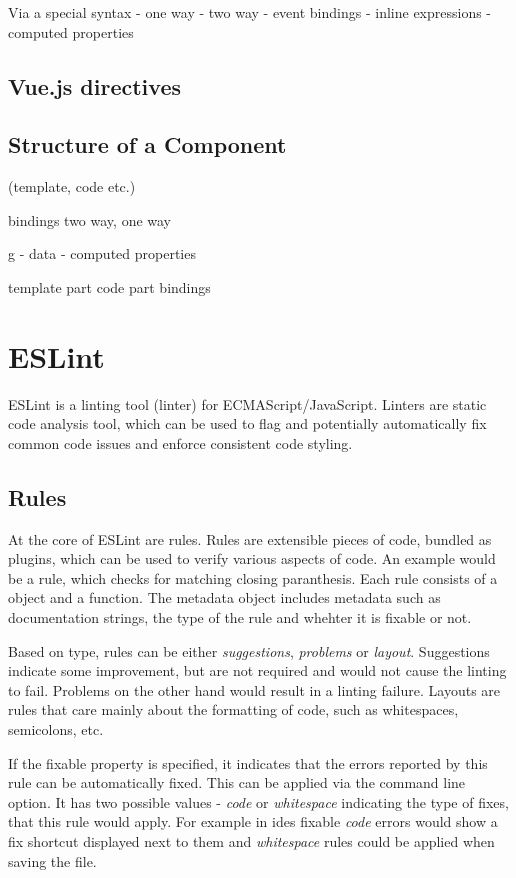 Via a special syntax
- one way
- two way
- event bindings
- inline expressions
- computed properties

\subsection{Vue.js directives}
\subsection{Structure of a Component}

(template, code etc.)

bindings two way, one way

g
- data
- computed properties

template part
code part
bindings


\section{ESLint}

ESLint \parencite{eslintMainPage} is a linting tool (linter) for ECMAScript/JavaScript. Linters are static code analysis tool, which can be used to flag and potentially automatically fix common code issues and enforce consistent code styling.

\subsection{Rules}
At the core of ESLint are rules. Rules are extensible pieces of code, bundled as plugins, which can be used to verify various aspects of code. An example would be a rule, which checks for matching closing paranthesis. 
Each rule consists of a  object
and a  function. The metadata object includes metadata such as documentation strings, the type of the rule and whehter it is fixable or not.

Based on type, rules can be either \textit{suggestions}, \textit{problems} or \textit{layout}. Suggestions indicate some improvement, but are not required and would not cause the linting to fail. Problems on the other hand would result in a linting failure. Layouts are rules that care mainly about the formatting of code, such as whitespaces, semicolons, etc. 

If the fixable property is specified, it indicates that the errors reported by this rule can be automatically fixed. This can be applied via the  command line option. It has two possible values - \textit{code} or \textit{whitespace} indicating the type of fixes, that this rule would apply. For example in \glspl{ide} fixable \textit{code} errors would show a fix shortcut displayed next to them and \textit{whitespace} rules could be applied when saving the file.

